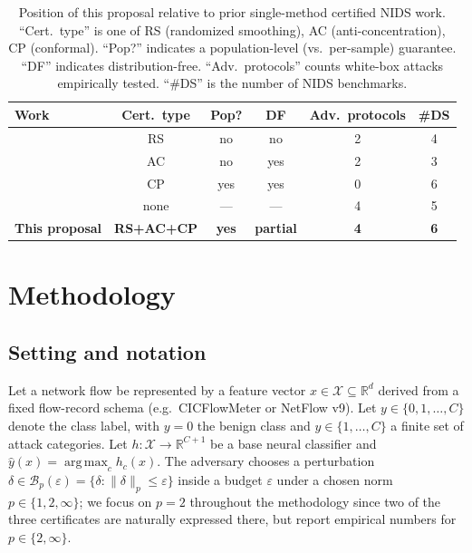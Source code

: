 \documentclass[journal,twoside]{IEEEtran}
\DeclareMathOperator*{\argmax}{arg\,max}
\begin{document}
\begin{table}[t]
\centering
\caption{Position of this proposal relative to prior single-method
certified NIDS work. ``Cert.\ type'' is one of RS (randomized smoothing),
AC (anti-concentration), CP (conformal). ``Pop?'' indicates a
population-level (vs.\ per-sample) guarantee. ``DF'' indicates
distribution-free. ``Adv.\ protocols'' counts white-box attacks
empirically tested. ``\#DS'' is the number of NIDS benchmarks.}
\label{tab:position}
\small
\begin{tabular}{lccccc}
\toprule
Work & Cert.\ type & Pop? & DF & Adv.\ protocols & \#DS \\
\midrule
\cite{anaedevha2024surrogate}   & RS  & no  & no  & 2 & 4 \\
\cite{chen2024sdeguard}         & AC  & no  & yes & 2 & 3 \\
\cite{anaedevha2026sslgraph}    & CP  & yes & yes & 0 & 6 \\
\cite{zou2024adversarialNIDS}   & none & --- & --- & 4 & 5 \\
\textbf{This proposal}          & \textbf{RS+AC+CP} & \textbf{yes} & \textbf{partial} & \textbf{4} & \textbf{6} \\
\bottomrule
\end{tabular}
\end{table}

\section{Methodology}\label{sec:methodology}

\subsection{Setting and notation}
Let a network flow be represented by a feature vector
$x \in \mathcal{X} \subseteq \mathbb{R}^d$ derived from a fixed
flow-record schema (e.g.\ CICFlowMeter or NetFlow v9). Let
$y \in \{0,1,\dots,C\}$ denote the class label, with $y=0$ the benign
class and $y \in \{1,\dots,C\}$ a finite set of attack categories. Let
$h : \mathcal{X} \to \mathbb{R}^{C+1}$ be a base neural classifier and
$\hat{y}(x) = \argmax_c h_c(x)$. The adversary chooses a perturbation
$\delta \in \mathcal{B}_p(\varepsilon) = \{\delta : \|\delta\|_p \le
\varepsilon\}$ inside a budget $\varepsilon$ under a chosen norm
$p \in \{1,2,\infty\}$; we focus on $p=2$ throughout the methodology
since two of the three certificates are naturally expressed there, but
report empirical numbers for $p\in\{2,\infty\}$.
\end{document}
